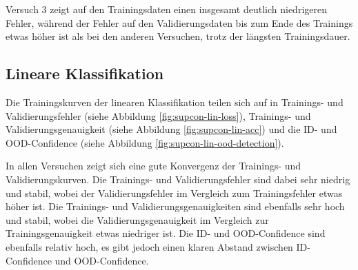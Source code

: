 Versuch 3 zeigt auf den Trainingsdaten einen insgesamt deutlich niedrigeren Fehler, während der Fehler auf den Validierungsdaten bis zum Ende des Trainings etwas höher ist als bei den anderen Versuchen, trotz der längsten Trainingsdauer.

\subsection{Lineare Klassifikation} \label{sec:supcon-lin-results}

Die Trainingskurven der linearen Klassifikation teilen sich auf in Trainings- und Validierungsfehler (siehe Abbildung \ref{fig:supcon-lin-loss}), Trainings- und Validierungsgenauigkeit (siehe Abbildung \ref{fig:supcon-lin-acc}) und die ID- und OOD-Confidence (siehe Abbildung \ref{fig:supcon-lin-ood-detection}).

In allen Versuchen zeigt sich eine gute Konvergenz der Trainings- und Validierungskurven. Die Trainings- und Validierungsfehler sind dabei sehr niedrig und stabil, wobei der Validierungsfehler im Vergleich zum Trainingsfehler etwas höher ist. Die Trainings- und Validierungsgenauigkeiten sind ebenfalls sehr hoch und stabil, wobei die Validierungsgenauigkeit im Vergleich zur Trainingsgenauigkeit etwas niedriger ist. Die ID- und OOD-Confidence sind ebenfalls relativ hoch, es gibt jedoch einen klaren Abstand zwischen ID-Confidence und OOD-Confidence.

